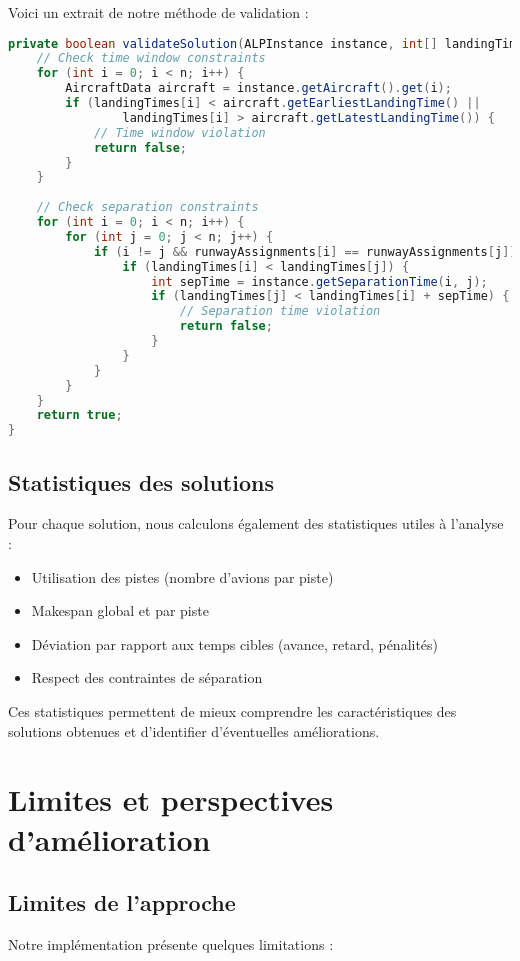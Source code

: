 \documentclass[a4paper,12pt]{report}
\begin{document}
Voici un extrait de notre méthode de validation :

\begin{lstlisting}[language=Java, caption=Validation des solutions]
private boolean validateSolution(ALPInstance instance, int[] landingTimes, int[] runwayAssignments) {
    // Check time window constraints
    for (int i = 0; i < n; i++) {
        AircraftData aircraft = instance.getAircraft().get(i);
        if (landingTimes[i] < aircraft.getEarliestLandingTime() ||
                landingTimes[i] > aircraft.getLatestLandingTime()) {
            // Time window violation
            return false;
        }
    }
    
    // Check separation constraints
    for (int i = 0; i < n; i++) {
        for (int j = 0; j < n; j++) {
            if (i != j && runwayAssignments[i] == runwayAssignments[j]) {
                if (landingTimes[i] < landingTimes[j]) {
                    int sepTime = instance.getSeparationTime(i, j);
                    if (landingTimes[j] < landingTimes[i] + sepTime) {
                        // Separation time violation
                        return false;
                    }
                }
            }
        }
    }
    return true;
}
\end{lstlisting}

\subsection{Statistiques des solutions}
Pour chaque solution, nous calculons également des statistiques utiles à l'analyse :

\begin{itemize}
  \item Utilisation des pistes (nombre d'avions par piste)
  \item Makespan global et par piste
  \item Déviation par rapport aux temps cibles (avance, retard, pénalités)
  \item Respect des contraintes de séparation
\end{itemize}

Ces statistiques permettent de mieux comprendre les caractéristiques des solutions obtenues et d'identifier d'éventuelles améliorations.

\section{Limites et perspectives d'amélioration}
\subsection{Limites de l'approche}
Notre implémentation présente quelques limitations :
\end{document}
